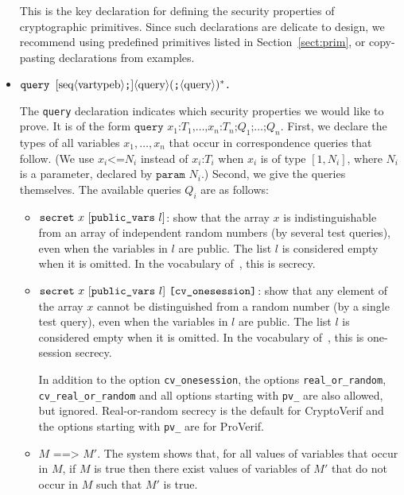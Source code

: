 \begin{itemize}
\begin{itemize}
\end{itemize}


\fi


This is the key declaration for defining the security properties of
cryptographic primitives. Since such declarations are delicate to
design, we recommend using predefined primitives listed in
Section~\ref{sect:prim}, or copy-pasting declarations from examples.

\item $\texttt{query }[\textrm{seq}\langle\textrm{vartypeb}\rangle\texttt{;}]\langle\textrm{query}\rangle(\texttt{;}\langle\textrm{query}\rangle)^* \texttt{.}$

The {\tt query} declaration indicates which security properties we 
would like to prove. It is of the form $\texttt{query }x_1\texttt{:}T_1\texttt{,} \ldots\texttt{,} x_n\texttt{:}T_n\texttt{;} Q_1\texttt{;} \dots\texttt{;}Q_n$. First, we declare the types of all variables $x_1, \ldots, x_n$
that occur in correspondence queries that follow. (We use $x_i \texttt{<=} N_i$ instead of
  $x_i\texttt{:} T_i$ when $x_i$ is of type $[1,N_i]$, where $N_i$ is
  a parameter, declared by $\texttt{param }N_i$.) Second, we give the queries themselves. The available queries $Q_i$ are as follows:
\begin{itemize}

\item ${\tt secret}\ x\ [\texttt{public\_vars}\ l]$: show that the array $x$ is indistinguishable
from an array of independent random numbers (by several test queries),
even when the variables in $l$ are public. The list $l$ is considered empty when it is omitted.
In the vocabulary of~\cite{BlanchetEPrint05}, this is secrecy.

\item ${\tt secret}\ x\ [\texttt{public\_vars}\ l]\ \texttt{[cv\_onesession]}$: 
show that any element of the array $x$ 
cannot be distinguished from a random number (by a single test query),
even when the variables in $l$ are public. The list $l$ is considered empty when it is omitted.
In the vocabulary of~\cite{BlanchetEPrint05}, this is one-session
secrecy.

In addition to the option \texttt{cv\_onesession}, the options \texttt{real\_or\_random},
\texttt{cv\_real\_or\_random} and all options starting with \texttt{pv\_} are also allowed,
but ignored. Real-or-random secrecy is the default for CryptoVerif and
the options starting with \texttt{pv\_} are for ProVerif.

\item $M \texttt{ ==> } M'$.
The system shows that, for all values of variables that occur in $M$,
if $M$ is true then there exist values of variables of $M'$ that do not
occur in $M$ such that $M'$ is true.


\end{itemize}
\end{itemize}
